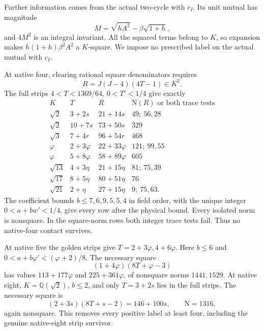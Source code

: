 Further information comes from the
actual two-cycle with \(c_I\).
Its unit mutual has magnitude
\[
                 M=\sqrt{hA^2}-\beta\sqrt{1+h},
\]
and \(4M^2\) is an integral invariant.
All the squared terms belong to \(K\),
so expansion makes
\(h(1+h)\beta^2A^2\) a \(K\)-square.
We impose no prescribed label on
the actual mutual with \(c_I\).

At native four, clearing rational
square denominators requires
\[
                         R=J(J-4)(4T-1)\in K^2 .
\]
The full strips
\(4<T<1369/64\), \(0<T'<1/4\)
give exactly
\[
\begin{array}{c|c|c|c}
 K&T&R&\mathrm N(R)\text{ or both trace tests}\\ \hline
 \sqrt2&3+2s&21+14s&49;\ 56,28\\
 \sqrt2&10+7s&73+50s&329\\
 \sqrt3&7+4r&96+54r&468\\
 \varphi&2+3\varphi&22+33\varphi&121;\ 99,55\\
 \varphi&5+8\varphi&58+89\varphi&605\\
 \sqrt{13}&4+3\eta&21+15\eta&81;\ 75,39\\
 \sqrt{17}&8+5\eta&80+51\eta&76\\
 \sqrt{21}&2+\eta&27+15\eta&9;\ 75,63 .
\end{array}
\]
The coefficient bounds \(b\le7,6,9,5,5,4\)
in field order, with the unique
integer \(0<a+bw'<1/4\), give every
row after the physical bound.
Every isolated norm is nonsquare.
In the square-norm rows both
integer trace tests fail.
Thus no native-four contact survives.

At native five the golden strips
give \(T=2+3\varphi,4+6\varphi\).
Here \(b\le6\) and
\(0<a+b\varphi'<(\varphi+2)/8\).
The necessary square
\[
                    (1+4\varphi)(8T+\varphi-3)
\]
has values \(113+177\varphi\) and
\(225+361\varphi\), of nonsquare norms
\(1441,1529\).
At native eight, \(K=\mathbb Q(\sqrt2)\),
\(b\le2\), and only \(T=3+2s\)
lies in the full strips.
The necessary square is
\[
              (2+3s)(8T+s-2)=146+100s,
                       \qquad\mathrm N=1316,
\]
again nonsquare.
This removes every positive label
at least four, including the genuine
native-eight strip survivor.


